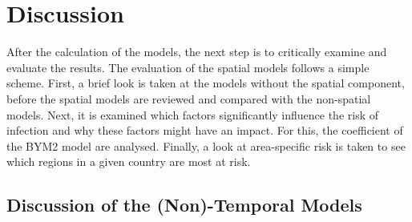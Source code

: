 %
\chapter{Discussion}\label{sec:discussion}
After the calculation of the models, the next step is to critically examine and evaluate the results. The evaluation of the spatial models follows a simple scheme. First, a brief look is taken at the models without the spatial component, before the spatial models are reviewed and compared with the non-spatial models. Next, it is examined which factors significantly influence the risk of infection and why these factors might have an impact. For this, the coefficient of the BYM2 model are analysed. Finally, a look at area-specific risk is taken to see which regions in a given country are most at risk.
\section{Discussion of the (Non)-Temporal Models}
